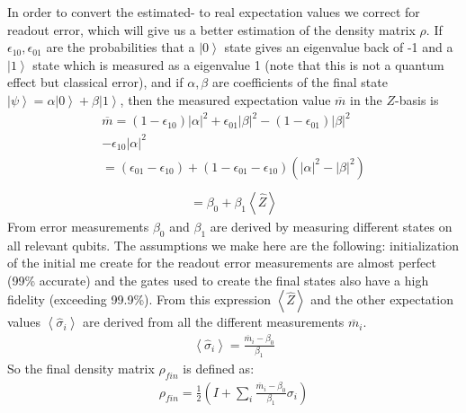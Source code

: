In order to convert the estimated- to real expectation values we correct for readout error, which will give us a better estimation of the density matrix $\rho$. If $\epsilon_{10},\epsilon_{01}$ are the probabilities that a $\left|0\right\rangle$ state gives an eigenvalue back of -1 and a $\left|1\right\rangle$ state which is measured as a eigenvalue 1 (note that this is not a quantum effect but classical error), and if $\alpha,\beta$ are coefficients of the final state $\left|\psi\right\rangle=\alpha\left|0\right\rangle+\beta\left|1\right\rangle$, then the measured expectation value $\overline{m}$ in the $Z$-basis is
\begin{equation*}
\begin{split}
\overline{m} =\left(1-\epsilon_{10}\right)\left|\alpha\right|^2+\epsilon_{01}\left|\beta\right|^2-\left(1-\epsilon_{01}\right)\left|\beta\right|^2\\
-\epsilon_{10}\left|\alpha\right|^2\\=\left(\epsilon_{01}-\epsilon_{10}\right)+\left(1-\epsilon_{01}-\epsilon_{10}\right)\left(\left|\alpha\right|^2-\left|\beta\right|^2\right)\\
\end{split}
\end{equation*}
\begin{equation}
\begin{split}
=\beta_0+\beta_1\left\langle \hat{Z}\right\rangle
\end{split}
\end{equation}
From error measurements $\beta_0$ and $\beta_1$ are derived by measuring different states on all relevant qubits. The assumptions we make here are the following: initialization of the initial me create for the readout error measurements are almost perfect (99\% accurate) and the gates used to create the final states also have a high fidelity (exceeding 99.9\%).
From this expression $\left\langle \hat{Z}\right\rangle$ and the other expectation values $\left\langle \hat{\sigma}_i\right\rangle$ are derived from all the different measurements $\overline{m}_i$.
\begin{equation}
\begin{split}
\left\langle \hat{\sigma}_i\right\rangle=\frac{\overline{m}_i-\beta_0}{\beta_1}
\end{split}
\end{equation}
So the final density matrix $\rho_{fin}$ is defined as:
\begin{equation}
\begin{split}
\rho_{fin}=\frac{1}{2}\left(I+\sum_i\frac{\overline{m}_i-\beta_0}{\beta_1}\sigma_i\right)
\end{split}
\end{equation}


